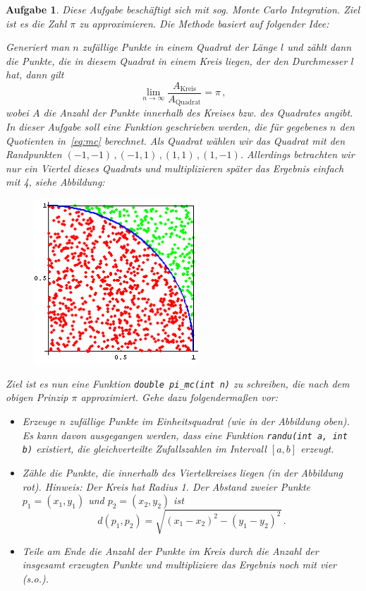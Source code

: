 \documentclass[a4paper,12pt,parskip=full]{scrartcl}
\theoremstyle{exercise}
\newtheorem{exercise}{Aufgabe}
\begin{document}
\begin{exercise}
  Diese Aufgabe beschäftigt sich mit sog. \emph{Monte Carlo Integration}. Ziel ist es
  die Zahl $\pi$ zu approximieren. Die Methode basiert auf folgender Idee:

  Generiert man $n$ zufällige Punkte in einem Quadrat der Länge $l$ und zählt dann die Punkte,
  die in diesem Quadrat in einem Kreis liegen, der den Durchmesser $l$ hat, dann gilt
  \begin{equation}
    \label{eq:mc}
    \lim_{n \rightarrow \infty} \frac{A_{\text{Kreis}}}{A_{\text{Quadrat}}} = \pi\,,
  \end{equation}
  wobei $A$ die Anzahl der Punkte innerhalb des Kreises bzw. des Quadrates angibt.
  In dieser Aufgabe soll eine Funktion geschrieben werden, die für gegebenes $n$ den
  Quotienten in~\eqref{eq:mc} berechnet. Als Quadrat wählen wir das Quadrat mit den
  Randpunkten $(-1,-1)\,,(-1,1)\,, (1,1)\,, (1,-1)$. Allerdings betrachten wir nur ein
  Viertel dieses Quadrats und multiplizieren später das Ergebnis einfach mit 4, siehe Abbildung:
  \begin{figure}[H]
    \centering
    \includegraphics[width=0.55\textwidth]{montecarlo.png}
  \end{figure}
  Ziel ist es nun eine Funktion \lstinline|double pi_mc(int n)| zu schreiben, die nach dem
  obigen Prinzip $\pi$ approximiert. Gehe dazu folgendermaßen vor:
  \begin{itemize}
  \item Erzeuge $n$ zufällige Punkte im Einheitsquadrat (wie in der Abbildung oben).
    Es kann davon ausgegangen werden, dass eine Funktion \lstinline|randu(int a, int b)|
    existiert, die gleichverteilte Zufallszahlen im Intervall $[a,b]$ erzeugt.
  \item Zähle die Punkte, die innerhalb des Viertelkreises liegen (in der Abbildung rot). Hinweis:
    Der Kreis hat Radius 1. Der Abstand zweier Punkte $p_1 = (x_1, y_1)$ und $p_2 = (x_2, y_2)$ ist
    \[
      d(p_1, p_2) = \sqrt{{(x_1 - x_2)}^2 - {(y_1 - y_2)}^2}\,.
    \]
  \item Teile am Ende die Anzahl der Punkte im Kreis durch die Anzahl der insgesamt
    erzeugten Punkte und multipliziere das Ergebnis noch mit vier (s.o.).
  \end{itemize}
  
\end{exercise}
\end{document}
